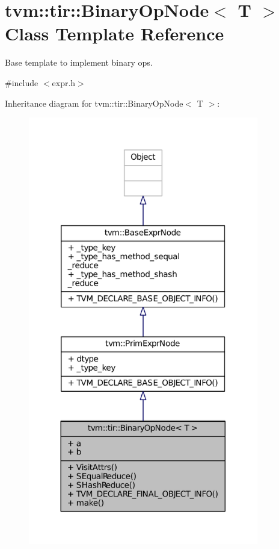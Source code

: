 \hypertarget{classtvm_1_1tir_1_1BinaryOpNode}{}\section{tvm\+:\+:tir\+:\+:Binary\+Op\+Node$<$ T $>$ Class Template Reference}
\label{classtvm_1_1tir_1_1BinaryOpNode}


Base template to implement binary ops.  




{\ttfamily \#include $<$expr.\+h$>$}



Inheritance diagram for tvm\+:\+:tir\+:\+:Binary\+Op\+Node$<$ T $>$\+:
\nopagebreak
\begin{figure}[H]
\begin{center}
\leavevmode
\includegraphics[width=285pt]{classtvm_1_1tir_1_1BinaryOpNode__inherit__graph}
\end{center}
\end{figure}


